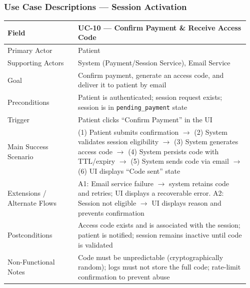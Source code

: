 \documentclass[12pt]{article}
\begin{document}
\subsubsection*{Use Case Descriptions --- Session Activation}
\begin{longtable}{L{0.28\linewidth} L{0.68\linewidth}}
\toprule
\textbf{Field} & \textbf{UC-10 --- Confirm Payment \& Receive Access Code} \\
\midrule
\endhead
Primary Actor & Patient \\
Supporting Actors & System (Payment/Session Service), Email Service \\
Goal & Confirm payment, generate an access code, and deliver it to patient by email \\
Preconditions & Patient is authenticated; session request exists; session is in \texttt{pending\_payment} state \\
Trigger & Patient clicks ``Confirm Payment'' in the UI \\
Main Success Scenario & (1) Patient submits confirmation $\rightarrow$ (2) System validates session eligibility $\rightarrow$ (3) System generates access code $\rightarrow$ (4) System persists code with TTL/expiry $\rightarrow$ (5) System sends code via email $\rightarrow$ (6) UI displays ``Code sent'' state \\
Extensions / Alternate Flows & A1: Email service failure $\rightarrow$ system retains code and retries; UI displays a recoverable error. A2: Session not eligible $\rightarrow$ UI displays reason and prevents confirmation \\
Postconditions & Access code exists and is associated with the session; patient is notified; session remains inactive until code is validated \\
Non-Functional Notes & Code must be unpredictable (cryptographically random); logs must not store the full code; rate-limit confirmation to prevent abuse \\
\bottomrule
\end{longtable}
\end{document}
